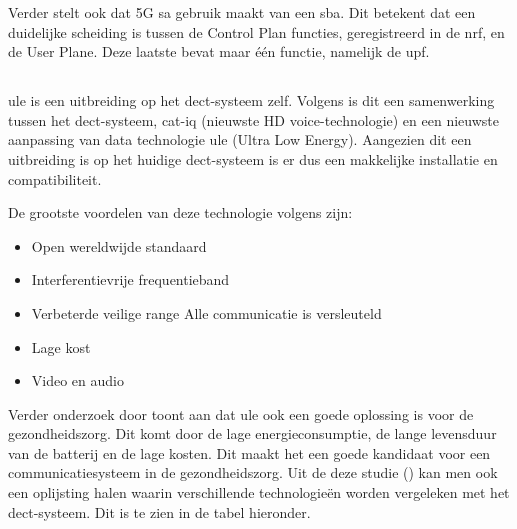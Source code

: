 Verder stelt \textcite{Lee2025a} ook dat 5G \gls{sa} gebruik maakt van een \gls{sba}. Dit betekent dat een duidelijke scheiding is tussen de Control Plan functies, geregistreerd in de \gls{nrf}, en de User Plane. Deze laatste bevat maar \'e\'en functie, namelijk de \gls{upf}.


\subsection{}%
\label{sec:ule}%

\gls{ule} is een uitbreiding op het \gls{dect}-systeem zelf. Volgens \textcite{GariniDil2014} is dit een samenwerking tussen het \gls{dect}-systeem, \gls{cat-iq} (nieuwste HD voice-technologie) en een nieuwste aanpassing van data technologie \gls{ule} (Ultra Low Energy). Aangezien dit een uitbreiding is op het huidige \gls{dect}-systeem is er dus een makkelijke installatie en compatibiliteit.

De grootste voordelen van deze technologie volgens \textcite{GariniDil2014} zijn:

\begin{itemize}
  \item Open wereldwijde standaard
  \item Interferentievrije frequentieband
  \item Verbeterde veilige range
  \subitem Alle communicatie is versleuteld
  \item Lage kost
  \item Video en audio
\end{itemize}


Verder onderzoek door \textcite{Das2012} toont aan dat \gls{ule} ook een goede oplossing is voor de gezondheidszorg. Dit komt door de lage energieconsumptie, de lange levensduur van de batterij en de lage kosten. Dit maakt het een goede kandidaat voor een communicatiesysteem in de gezondheidszorg. Uit de deze studie (\textcite{Das2012}) kan men ook een oplijsting halen waarin verschillende technologieën worden vergeleken met het \gls{dect}-systeem. Dit is te zien in de tabel hieronder.


